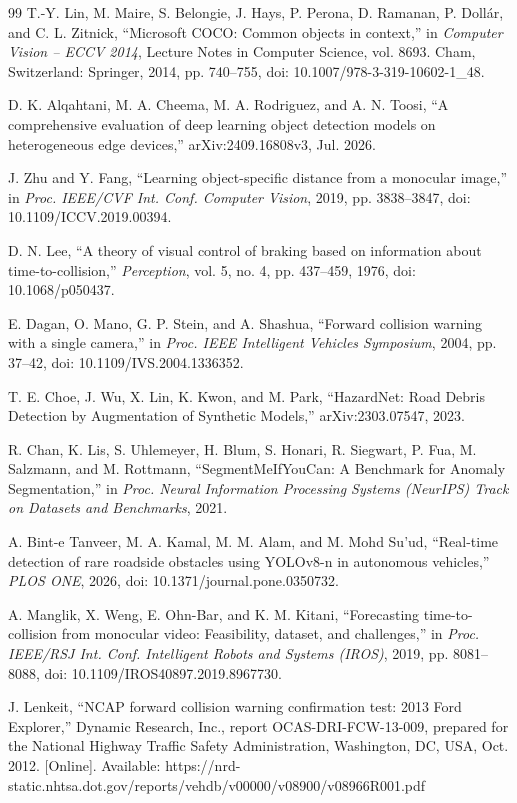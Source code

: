 \begin{thebibliography}{99}
 T.-Y. Lin, M. Maire, S. Belongie, J. Hays, P. Perona, D. Ramanan, P. Doll\'ar, and C. L. Zitnick, ``Microsoft COCO: Common objects in context,'' in \emph{Computer Vision -- ECCV 2014}, Lecture Notes in Computer Science, vol. 8693. Cham, Switzerland: Springer, 2014, pp. 740--755, doi: 10.1007/978-3-319-10602-1\_48.

 D. K. Alqahtani, M. A. Cheema, M. A. Rodriguez, and A. N. Toosi, ``A comprehensive evaluation of deep learning object detection models on heterogeneous edge devices,'' arXiv:2409.16808v3, Jul. 2026.

 J. Zhu and Y. Fang, ``Learning object-specific distance from a monocular image,'' in \emph{Proc. IEEE/CVF Int. Conf. Computer Vision}, 2019, pp. 3838--3847, doi: 10.1109/ICCV.2019.00394.

 D. N. Lee, ``A theory of visual control of braking based on information about time-to-collision,'' \emph{Perception}, vol. 5, no. 4, pp. 437--459, 1976, doi: 10.1068/p050437.

 E. Dagan, O. Mano, G. P. Stein, and A. Shashua, ``Forward collision warning with a single camera,'' in \emph{Proc. IEEE Intelligent Vehicles Symposium}, 2004, pp. 37--42, doi: 10.1109/IVS.2004.1336352.

 T. E. Choe, J. Wu, X. Lin, K. Kwon, and M. Park, ``HazardNet: Road Debris Detection by Augmentation of Synthetic Models,'' arXiv:2303.07547, 2023.

 R. Chan, K. Lis, S. Uhlemeyer, H. Blum, S. Honari, R. Siegwart, P. Fua, M. Salzmann, and M. Rottmann, ``SegmentMeIfYouCan: A Benchmark for Anomaly Segmentation,'' in \emph{Proc. Neural Information Processing Systems (NeurIPS) Track on Datasets and Benchmarks}, 2021.

 A. Bint-e Tanveer, M. A. Kamal, M. M. Alam, and M. Mohd Su'ud, ``Real-time detection of rare roadside obstacles using YOLOv8-n in autonomous vehicles,'' \emph{PLOS ONE}, 2026, doi: 10.1371/journal.pone.0350732.

 A. Manglik, X. Weng, E. Ohn-Bar, and K. M. Kitani, ``Forecasting time-to-collision from monocular video: Feasibility, dataset, and challenges,'' in \emph{Proc. IEEE/RSJ Int. Conf. Intelligent Robots and Systems (IROS)}, 2019, pp. 8081--8088, doi: 10.1109/IROS40897.2019.8967730.

 J. Lenkeit, ``NCAP forward collision warning confirmation test: 2013 Ford Explorer,'' Dynamic Research, Inc., report OCAS-DRI-FCW-13-009, prepared for the National Highway Traffic Safety Administration, Washington, DC, USA, Oct. 2012. [Online]. Available: https://nrd-static.nhtsa.dot.gov/reports/vehdb/v00000/v08900/v08966R001.pdf


\end{thebibliography}
